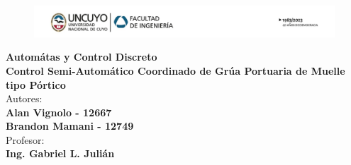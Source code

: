 \documentclass{article}
\begin{document}
\begin{titlepage}
    \centering
    \begin{figure}[h]
        \centering
        \includegraphics[width=1\textwidth]{encabezado.png}
    \end{figure}
    \vspace*{3cm}
    \huge{\textbf{Automátas y Control Discreto}}\\
    \vspace*{3cm}
    \Huge\textbf{Control Semi-Automático Coordinado de Grúa Portuaria de Muelle tipo Pórtico}\\
    \vspace*{6cm}
    \large{Autores:}\\
    \large{\textbf{Alan Vignolo - 12667\\Brandon Mamani - 12749}}\\
    \vspace*{1cm}
    \large{Profesor:}\\
    \large{\textbf{Ing. Gabriel L. Julián}}\\
    \vfill
    \the\year\\ %
\end{titlepage}


\tableofcontents
{}

\newpage











\label{LastPage}
\end{document}
